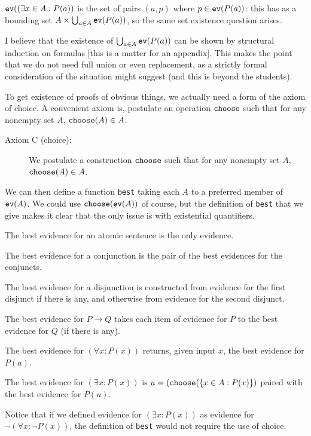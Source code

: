 \documentclass[12pt]{article}
\begin{document}
\begin{description}
${\tt ev}((\exists x \in A:P(a))$ is the set of pairs $(a,p)$ where $p \in {\tt ev}(P(a))$:  this has as a bounding
set $A \times \bigcup_{a \in A}{\tt ev}(P(a))$, so the same set existence question arises.

I believe that the existence of $\bigcup_{a \in A}{\tt ev}(P(a))$ can be shown by structural induction on formulas [this is a matter for an appendix].  This makes the point that we do not need full union or even replacement, as a strictly formal consideration of the situation might suggest (and this is beyond the students).

To get existence of proofs of obvious things, we actually need a form of the axiom of choice.  A convenient
axiom is, postulate an operation ${\tt choose}$ such that for any nonempty set $A$, ${\tt choose}(A) \in A$.

\begin{description}

\item[Axiom C (choice):]  We postulate a construction ${\tt choose}$ such that for any nonempty set $A$,
${\tt choose}(A) \in A$.

\end{description}

We can then define a function {\tt best} taking each $A$ to a preferred member of ${\tt ev}(A)$.  We could use ${\tt choose}({\tt ev}(A))$ of course, but the definition of {\tt best} that we give makes it clear that the only issue is with existential quantifiers.

The best evidence for an atomic sentence is the only evidence.

The best evidence for a conjunction is the pair of the best evidences for the conjuncts.

The best evidence for a disjunction is constructed from evidence for the first disjunct if there is any, and otherwise from evidence for the second disjunct.

The best evidence for $P\rightarrow Q$ takes each item of evidence for $P$ to the best evidence for $Q$ (if there is any).

The best evidence for $(\forall x:P(x))$ returns, given input $x$, the best evidence for $P(a)$.

The best evidence for $(\exists x:P(x))$ is $u=({\tt choose}(\{x \in A:P(x)\})$ paired with the best evidence for $P(u)$.

Notice that if we defined evidence for $(\exists x:P(x))$ as evidence for $\neg(\forall x:\neg P(x))$, the definition of {\tt best} would not require the use of choice.















\end{description}
\end{document}
